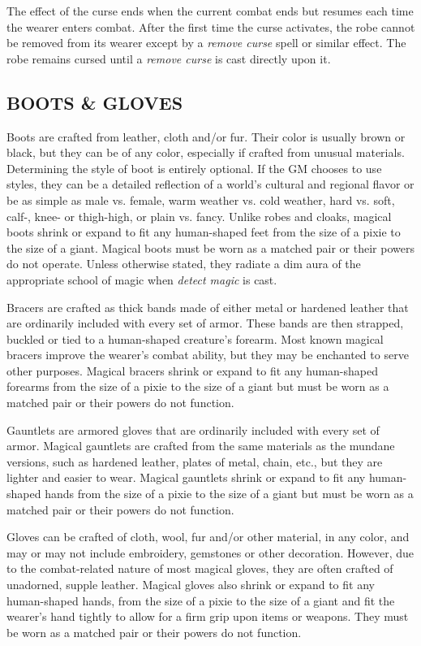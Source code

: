 \begin{multicols}{2}
The effect of the curse ends when the current combat ends but resumes each time the wearer enters combat.  After the first time the curse activates, the robe cannot be removed from its wearer except by a \textit{remove curse} spell or similar effect.  The robe remains cursed until a \textit{remove curse }is cast directly upon it.

\subsection{BOOTS \& GLOVES}

Boots are crafted from leather, cloth and/or fur.  Their color is usually brown or black, but they can be of any color, especially if crafted from unusual materials.  Determining the style of boot is entirely optional.  If the GM chooses to use styles, they can be a detailed reflection of a world's cultural and regional flavor or be as simple as male vs. female, warm weather vs. cold weather, hard vs. soft, calf-, knee- or thigh-high, or plain vs. fancy.  Unlike robes and cloaks, magical boots shrink or expand to fit any human-shaped feet from the size of a pixie to the size of a giant.  Magical boots must be worn as a matched pair or their powers do not operate.  Unless otherwise stated, they radiate a dim aura of the appropriate school of magic when \textit{detect magic} is cast.

Bracers are crafted as thick bands made of either metal or hardened leather that are ordinarily included with every set of armor.  These bands are then strapped, buckled or tied to a human-shaped creature's forearm.  Most known magical bracers improve the wearer's combat ability, but they may be enchanted to serve other purposes.  Magical bracers shrink or expand to fit any human-shaped forearms from the size of a pixie to the size of a giant but must be worn as a matched pair or their powers do not function.

Gauntlets are armored gloves that are ordinarily included with every set of armor.  Magical gauntlets are crafted from the same materials as the mundane versions, such as hardened leather, plates of metal, chain, etc., but they are lighter and easier to wear.  Magical gauntlets shrink or expand to fit any human-shaped hands from the size of a pixie to the size of a giant but must be worn as a matched pair or their powers do not function.

Gloves can be crafted of cloth, wool, fur and/or other material, in any color, and may or may not include embroidery, gemstones or other decoration.  However, due to the combat-related nature of most magical gloves, they are often crafted of unadorned, supple leather.  Magical gloves also shrink or expand to fit any human-shaped hands, from the size of a pixie to the size of a giant and fit the wearer's hand tightly to allow for a firm grip upon items or weapons.  They must be worn as a matched pair or their powers do not function.


\end{multicols}
